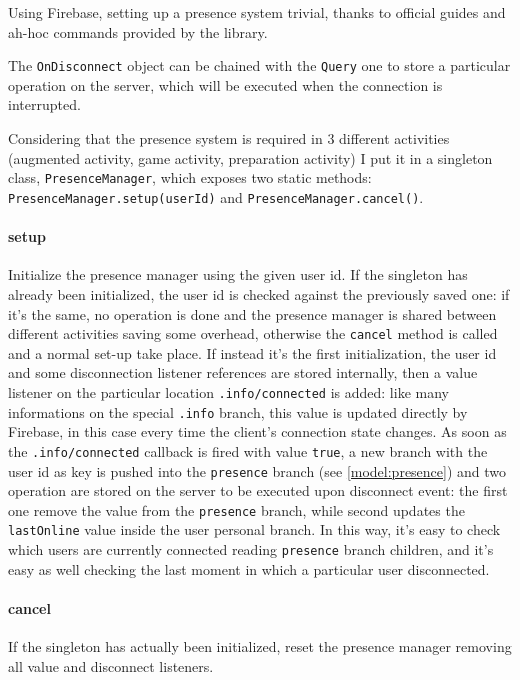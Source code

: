			Using Firebase, setting up a presence system trivial, thanks to official guides\cite{firebase:presence} and ah-hoc commands provided by the library.
			
			The \lstinline|OnDisconnect| object can be chained with the \lstinline|Query| one to store a particular operation on the server, which will be executed when the connection is interrupted.
			
			Considering that the presence system is required in 3 different activities (augmented activity, game activity, preparation activity) I put it in a singleton class, \lstinline|PresenceManager|, which exposes two static methods: \lstinline|PresenceManager.setup(userId)| and \lstinline|PresenceManager.cancel()|.
		 
			\paragraph{setup}
			Initialize the presence manager using the given user id.
			If the singleton has already been initialized, the user id is checked against the previously saved one: if it's the same, no operation is done  and the presence manager is shared between different activities saving some overhead, otherwise the \lstinline|cancel| method is called and a normal set-up take place.
			If instead it's the first initialization, the user id and some disconnection listener references are stored internally, then a value listener on the particular location \lstinline|.info/connected| is added: like many informations on the special \lstinline|.info| branch, this value is updated directly by Firebase, in this case every time the client's connection state changes.
			As soon as the \lstinline|.info/connected| callback is fired with value \lstinline|true|, a new branch with the user id as key is pushed into the \lstinline|presence| branch (see \autoref{model:presence}) and two operation are stored on the server to be executed upon disconnect event: the first one remove the value from the \lstinline|presence| branch, while second updates the \lstinline|lastOnline| value inside the user personal branch.
			In this way, it's easy to check which users are currently connected reading  \lstinline|presence| branch children, and it's easy as well checking the last moment in which a particular user disconnected.
			
			\paragraph{cancel}
			If the singleton has actually been initialized, reset the presence manager removing all value and disconnect listeners.
		
